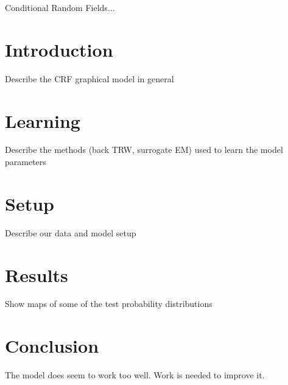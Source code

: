 


Conditional Random Fields...

\section{Introduction}

Describe the CRF graphical model in general

\section{Learning}

Describe the methods (back TRW, surrogate EM) used to learn the model parameters

\section{Setup}

Describe our data and model setup

\section{Results}

Show maps of some of the test probability distributions

\section{Conclusion}

The model does seem to work too well. Work is needed to improve it. 


